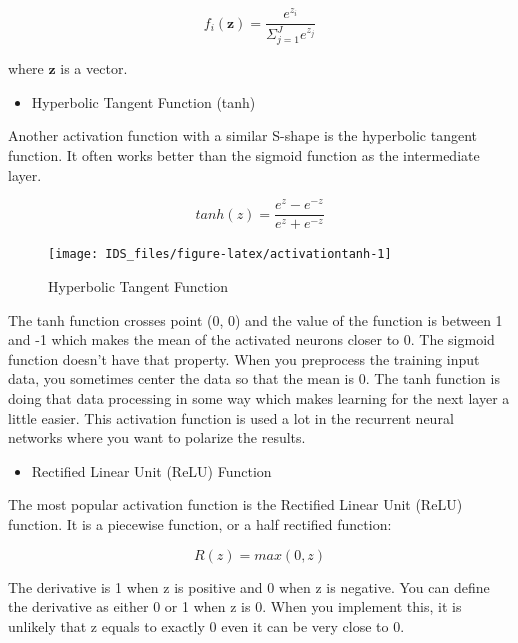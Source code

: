 \documentclass[12pt,]{krantz}
\providecommand{\tightlist}{%
  \setlength{\itemsep}{0pt}\setlength{\parskip}{0pt}}
\begin{document}
\begin{equation}
f_i(\mathbf{z}) = \frac{e^{z_i}}{\Sigma_{j=1}^{J} e^{z_j} }
\label{eq:softmax}
\end{equation}

where \(\mathbf{z}\) is a vector.

\begin{itemize}
\tightlist
\item
  Hyperbolic Tangent Function (tanh)
\end{itemize}

Another activation function with a similar S-shape is the hyperbolic tangent function. It often works better than the sigmoid function as the intermediate layer.

\begin{equation}
tanh(z) = \frac{e^{z} - e^{-z}}{e^{z} + e^{-z}}
\label{eq:tanh}
\end{equation}

\begin{figure}

{\centering \texttt{[image: IDS\_files/figure-latex/activationtanh-1]} 

}

\caption{Hyperbolic Tangent Function}\label{fig:activationtanh}
\end{figure}

The tanh function crosses point (0, 0) and the value of the function is between 1 and -1 which makes the mean of the activated neurons closer to 0. The sigmoid function doesn't have that property. When you preprocess the training input data, you sometimes center the data so that the mean is 0. The tanh function is doing that data processing in some way which makes learning for the next layer a little easier. This activation function is used a lot in the recurrent neural networks where you want to polarize the results.

\begin{itemize}
\tightlist
\item
  Rectified Linear Unit (ReLU) Function
\end{itemize}

The most popular activation function is the Rectified Linear Unit (ReLU) function. It is a piecewise function, or a half rectified function:

\begin{equation}
R(z) = max(0, z)
\label{eq:relu}
\end{equation}

The derivative is 1 when z is positive and 0 when z is negative. You can define the derivative as either 0 or 1 when z is 0. When you implement this, it is unlikely that z equals to exactly 0 even it can be very close to 0.
\end{document}
